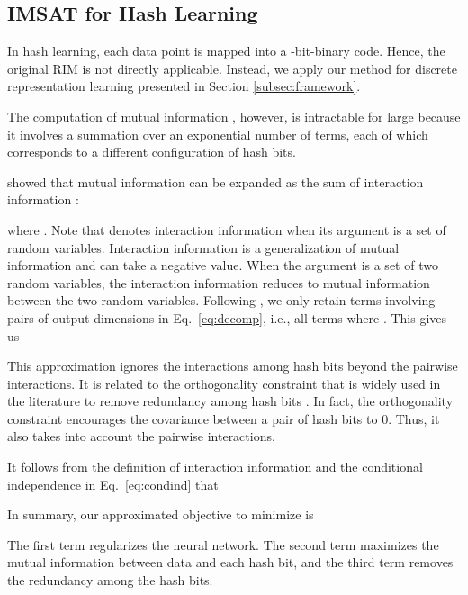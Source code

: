 \documentclass{article}
\theoremstyle{plain}
\begin{document}
\subsection{IMSAT for Hash Learning} \label{subsec:adapt_hashing}
In hash learning, each data point is mapped into a -bit-binary code. Hence, the original RIM is not directly applicable. Instead, we apply our method for discrete representation learning presented in Section \ref{subsec:framework}.

The computation of mutual information , however, is intractable for large  because it involves a summation over an exponential number of terms, each of which corresponds to a different configuration of hash bits.

\citet{brown2009new} showed that mutual information  can be expanded as the sum of interaction information \citep{mcgill1954multivariate}:

where . Note that  denotes interaction information when its argument is a set of random variables. 
Interaction information is a generalization of mutual information and can take a negative value. 
When the argument is a set of two random variables, the interaction information reduces to mutual information between the two random variables.
Following \citet{brown2009new}, we only retain terms involving pairs of output dimensions in Eq.~\eqref{eq:decomp}, i.e., all terms where . This gives us

This approximation ignores the interactions among hash bits beyond the pairwise interactions. 
It is related to the orthogonality constraint that is widely used in the literature to remove redundancy among hash bits \citep{wang2016learning}. 
In fact, the orthogonality constraint encourages the covariance between a pair of hash bits to 0. Thus, it also takes into account the pairwise interactions.

It follows from the definition of interaction information and the conditional independence in Eq.~\eqref{eq:condind} that


In summary, our approximated objective to minimize is

The first term regularizes the neural network.
The second term maximizes the mutual information between data and each hash bit, and the third term removes the redundancy among the hash bits.
\end{document}
